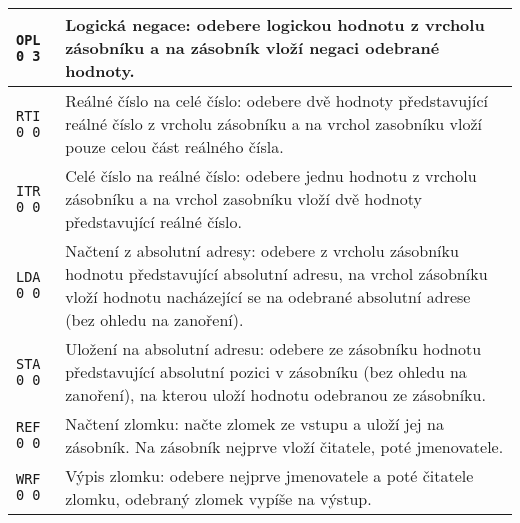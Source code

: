 \documentclass{article}
\begin{document}
\begin{longtable}{|l| p{10cm}|}
		\rule{0pt}{4ex} \texttt{OPL 0 3} & Logická negace: odebere logickou hodnotu z vrcholu zásobníku a na zásobník vloží negaci odebrané hodnoty. \\ \hline
		
		\rule{0pt}{3ex} \texttt{RTI 0 0} & Reálné číslo na celé číslo: odebere dvě hodnoty představující reálné číslo z vrcholu zásobníku a na vrchol zasobníku vloží pouze celou část reálného čísla. \\ \hline
		
		\rule{0pt}{3ex} \texttt{ITR 0 0} & Celé číslo na reálné číslo: odebere jednu hodnotu z vrcholu zásobníku a na vrchol zasobníku vloží dvě hodnoty představující reálné číslo. \\ \hline
		
		\rule{0pt}{3ex} \texttt{LDA 0 0} & Načtení z absolutní adresy: odebere z vrcholu zásobníku hodnotu představující absolutní adresu, na vrchol zásobníku vloží hodnotu nacházející se na odebrané absolutní adrese (bez ohledu na zanoření). \\ \hline
		
		\rule{0pt}{3ex} \texttt{STA 0 0} & Uložení na absolutní adresu: odebere ze zásobníku hodnotu představující absolutní pozici v zásobníku (bez ohledu na zanoření), na kterou uloží hodnotu odebranou ze zásobníku. \\ \hline
		
		\rule{0pt}{3ex} \texttt{REF 0 0} & Načtení zlomku: načte zlomek ze vstupu a uloží jej na zásobník. Na zásobník nejprve vloží čitatele, poté jmenovatele. \\ \hline
		
		\rule{0pt}{3ex} \texttt{WRF 0 0} & Výpis zlomku: odebere nejprve jmenovatele a poté čitatele zlomku, odebraný zlomek vypíše na výstup. \\ \hline
	\end{longtable}
\end{document}
